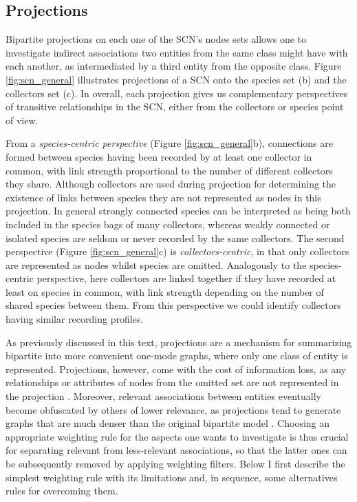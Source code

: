{%
\subsection{Projections} \label{section:scn_projection}

Bipartite projections on each one of the SCN's nodes sets allows one to investigate indirect associations two entities from the same class might have with each another, as intermediated by a third entity from the opposite class. 
Figure \ref{fig:scn_general} illustrates projections of a SCN onto the species set (b) and the collectors set (c).
In overall, each projection gives us complementary perspectives of transitive relationships in the SCN, either from the collectors or species point of view.

From a \textit{species-centric perspective} (Figure \ref{fig:scn_general}b), connections are formed between species having been recorded by at least one collector in common, with link strength proportional to the number of different collectors they share. 
Although collectors are used during projection for determining the existence of links between species they are not represented as nodes in this projection.
In general strongly connected species can be interpreted as being both included in the species bags of many collectors, whereas weakly connected or isolated species are seldom or never recorded by the same collectors.
The second perspective (Figure \ref{fig:scn_general}c) is \textit{collectors-centric}, in that only collectors are represented as nodes whilst species are omitted. 
Analogously to the species-centric perspective, here collectors are linked together if they have recorded at least on species in common, with link strength depending on the number of shared species between them. 
From this perspective we could identify collectors having similar recording profiles.

As previously discussed in this text, projections are a mechanism for summarizing bipartite into more convenient one-mode graphs, where only one class of entity is represented. 
Projections, however, come with the cost of information loss, as any relationships or attributes of nodes from the omitted set are not represented in the projection \cite{Borgatti1997}. 
Moreover, relevant associations between entities eventually become obfuscated by others of lower relevance, as projections tend to generate graphs that are much denser than the original bipartite model \cite{Lambiotte2005}.
Choosing an appropriate weighting rule for the aspects one wants to investigate is thus crucial for separating relevant from less-relevant associations, so that the latter ones can be subsequently removed by applying weighting filters.
Below I first describe the simplest weighting rule with its limitations and, in sequence, some alternatives rules for overcoming them.

}
